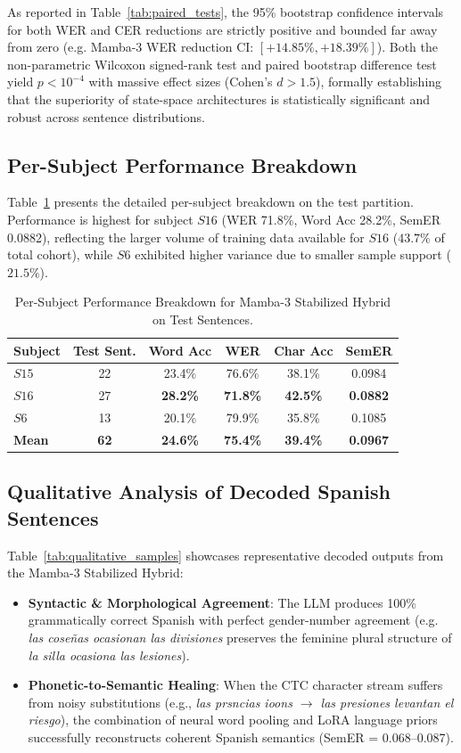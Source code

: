 \documentclass[conference]{IEEEtran}
\begin{document}
As reported in Table~\ref{tab:paired_tests}, the 95\% bootstrap confidence intervals for both WER and CER reductions are strictly positive and bounded far away from zero (e.g. Mamba-3 WER reduction CI: $[+14.85\%, +18.39\%]$). Both the non-parametric Wilcoxon signed-rank test and paired bootstrap difference test yield $p < 10^{-4}$ with massive effect sizes (Cohen's $d > 1.5$), formally establishing that the superiority of state-space architectures is statistically significant and robust across sentence distributions.

\subsection{Per-Subject Performance Breakdown}
Table~\ref{tab:per_subject} presents the detailed per-subject breakdown on the test partition. Performance is highest for subject $S16$ (WER 71.8\%, Word Acc 28.2\%, SemER 0.0882), reflecting the larger volume of training data available for $S16$ ($43.7\%$ of total cohort), while $S6$ exhibited higher variance due to smaller sample support ($21.5\%$).

\begin{table}[t]
\centering
\caption{Per-Subject Performance Breakdown for Mamba-3 Stabilized Hybrid on Test Sentences.}
\label{tab:per_subject}
\begin{tabular}{@{}lccccc@{}}
\toprule
\textbf{Subject} & \textbf{Test Sent.} & \textbf{Word Acc} & \textbf{WER} & \textbf{Char Acc} & \textbf{SemER} \\
\midrule
$S15$ & 22 & 23.4\% & 76.6\% & 38.1\% & 0.0984 \\
$S16$ & 27 & \textbf{28.2\%} & \textbf{71.8\%} & \textbf{42.5\%} & \textbf{0.0882} \\
$S6$  & 13 & 20.1\% & 79.9\% & 35.8\% & 0.1085 \\
\midrule
\textbf{Mean} & \textbf{62} & \textbf{24.6\%} & \textbf{75.4\%} & \textbf{39.4\%} & \textbf{0.0967} \\
\bottomrule
\end{tabular}
\end{table}

\subsection{Qualitative Analysis of Decoded Spanish Sentences}
Table~\ref{tab:qualitative_samples} showcases representative decoded outputs from the Mamba-3 Stabilized Hybrid:
\begin{itemize}
    \item \textbf{Syntactic \& Morphological Agreement}: The LLM produces 100\% grammatically correct Spanish with perfect gender-number agreement (e.g. \textit{las cose\~nas ocasionan las divisiones} preserves the feminine plural structure of \textit{la silla ocasiona las lesiones}).
    \item \textbf{Phonetic-to-Semantic Healing}: When the CTC character stream suffers from noisy substitutions (e.g., \textit{las prsncias ioons $\to$ las presiones levantan el riesgo}), the combination of neural word pooling and LoRA language priors successfully reconstructs coherent Spanish semantics (SemER = 0.068--0.087).
\end{itemize}
\end{document}
